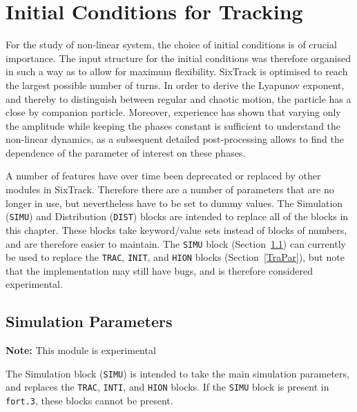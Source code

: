 
\chapter{Initial Conditions for Tracking} \label{InitCondTrack}

For the study of non-linear system, the choice of initial conditions is of crucial importance.
The input structure for the initial conditions was therefore organised in such a way as to allow for maximum flexibility.
SixTrack is optimised to reach the largest possible number of turns.
In order to derive the Lyapunov exponent, and thereby to distinguish between regular and chaotic motion, the particle has a close by companion particle.
Moreover, experience has shown that varying only the amplitude while keeping the phases constant is sufficient to understand the non-linear dynamics, as a subsequent detailed post-processing allows to find the dependence of the parameter of interest on these phases.

A number of features have over time been deprecated or replaced by other modules in SixTrack.
Therefore there are a number of parameters that are no longer in use, but nevertheless have to be set to dummy values.
The Simulation (\texttt{SIMU}) and Distribution (\texttt{DIST}) blocks are intended to replace all of the blocks in this chapter.
These blocks take keyword/value sets instead of blocks of numbers, and are therefore easier to maintain.
The \texttt{SIMU} block (Section~\ref{Input:SIMU}) can currently be used to replace the \texttt{TRAC}, \texttt{INIT}, and \texttt{HION} blocks (Section~\ref{TraPar}), but note that the implementation may still have bugs, and is therefore considered experimental.

\section{Simulation Parameters} \label{Input:SIMU}

\textcolor{notered}{\textbf{Note:} This module is experimental}

\bigskip
The Simulation block (\texttt{SIMU}) is intended to take the main simulation parameters, and replaces the \texttt{TRAC}, \texttt{INTI}, and \texttt{HION} blocks.
If the \texttt{SIMU} block is present in \texttt{fort.3}, these blocks cannot be present.

